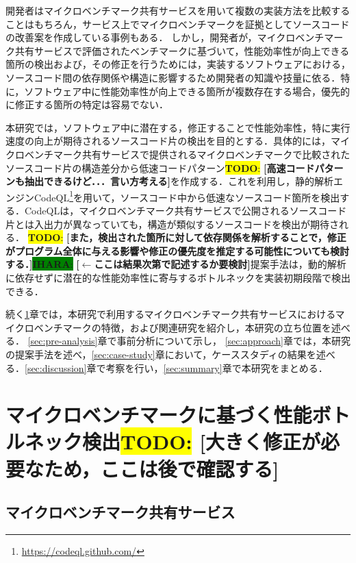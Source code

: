 \documentclass[submit,techrep,noauthor]{ipsj}
\newcommand{\todo}[1]{\colorbox{yellow}{{\bf TODO}:}{\color{red} {\textbf{[#1]}}}}
\newcommand{\ihara}[1]{\colorbox{green}{{\bf IHARA}:}{\color{blue} {\textbf{[#1]}}}}
\begin{document}
開発者はマイクロベンチマーク共有サービスを用いて複数の実装方法を比較することはもちろん，サービス上でマイクロベンチマークを証拠としてソースコードの改善案を作成している事例もある\cite{saiki}．
しかし，開発者が，マイクロベンチマーク共有サービスで評価されたベンチマークに基づいて，性能効率性が向上できる箇所の検出および，その修正を行うためには，実装するソフトウェアにおける，ソースコード間の依存関係や構造に影響するため開発者の知識や技量に依る．特に，ソフトウェア中に性能効率性が向上できる箇所が複数存在する場合，優先的に修正する箇所の特定は容易でない．

本研究では，ソフトウェア中に潜在する，修正することで性能効率性，特に実行速度の向上が期待されるソースコード片の検出を目的とする．具体的には，マイクロベンチマーク共有サービスで提供されるマイクロベンチマークで比較されたソースコード片の構造差分から低速コードパターン\todo{高速コードパターンも抽出できるけど．．．言い方考える}を作成する．これを利用し，静的解析エンジンCodeQL\footnote{\url{https://codeql.github.com/}}\cite{ql}を用いて，ソースコード中から低速なソースコード箇所を検出する．CodeQLは，マイクロベンチマーク共有サービスで公開されるソースコード片とは入出力が異なっていても，構造が類似するソースコードを検出が期待される．
\todo{また，検出された箇所に対して依存関係を解析することで，修正がプログラム全体に与える影響や修正の優先度を推定する可能性についても検討する．}\ihara{$\leftarrow$ここは結果次第で記述するか要検討}提案手法は，動的解析に依存せずに潜在的な性能効率性に寄与するボトルネックを実装初期段階で検出できる．

続く\ref{sec:background}章では，本研究で利用するマイクロベンチマーク共有サービスにおけるマイクロベンチマークの特徴，および関連研究を紹介し，本研究の立ち位置を述べる． \ref{sec:pre-analysis}章で事前分析について示し， \ref{sec:approach}章では，本研究の提案手法を述べ，\ref{sec:case-study}章において，ケーススタディの結果を述べる．\ref{sec:discussion}章で考察を行い，\ref{sec:summary}章で本研究をまとめる． 


\section{マイクロベンチマークに基づく性能ボトルネック検出\todo{大きく修正が必要なため，ここは後で確認する}}
\label{sec:background}

\subsection{マイクロベンチマーク共有サービス}
\end{document}
